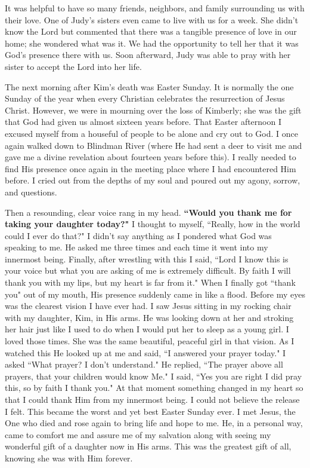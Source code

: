 \documentclass[oneside]{book}
\begin{document}
It was helpful to have so many friends, neighbors, and family surrounding us with their love. One of Judy's sisters even came to live with us for a week. She didn't know the Lord but commented that there was a tangible presence of love in our home; she wondered what was it. We had the opportunity to tell her that it was God's presence there with us. Soon afterward, Judy was able to pray with her sister to accept the Lord into her life.

The next morning after Kim's death was Easter Sunday. It is normally the one Sunday of the year when every Christian celebrates the resurrection of Jesus Christ. However, we were in mourning over the loss of Kimberly; she was the gift that God had given us almost sixteen years before. That Easter afternoon I excused myself from a houseful of people to be alone and cry out to God. I once again walked down to Blindman River (where He had sent a deer to visit me and gave me a divine revelation about fourteen years before this). I really needed to find His presence once again in the meeting place where I had encountered Him before. I cried out from the depths of my soul and poured out my agony, sorrow, and questions.

Then a resounding, clear voice rang in my head. \textbf{``Would you thank me for taking your daughter today?"} I thought to myself, ``Really, how in the world could I ever do that?" I didn't say anything as I pondered what God was speaking to me. He asked me three times and each time it went into my innermost being. Finally, after wrestling with this I said, ``Lord I know this is your voice but what you are asking of me is extremely difficult. By faith I will thank you with my lips, but my heart is far from it." When I finally got ``thank you" out of my mouth, His presence suddenly came in like a flood. Before my eyes was the clearest vision I have ever had. I saw Jesus sitting in my rocking chair with my daughter, Kim, in His arms. He was looking down at her and stroking her hair just like I used to do when I would put her to sleep as a young girl. I loved those times. She was the same beautiful, peaceful girl in that vision. As I watched this He looked up at me and said, ``I answered your prayer today." I asked ``What prayer? I don't understand." He replied, ``The prayer above all prayers, that your children would know Me." I said, ``Yes you are right I did pray this, so by faith I thank you." At that moment something changed in my heart so that I could thank Him from my innermost being. I could not believe the release I felt.  This became the worst and yet best Easter Sunday ever. I met Jesus, the One who died and rose again to bring life and hope to me. He, in a personal way, came to comfort me and assure me of my salvation along with seeing my wonderful gift of a daughter now in His arms. This was the greatest gift of all, knowing she was with Him forever.
\end{document}
